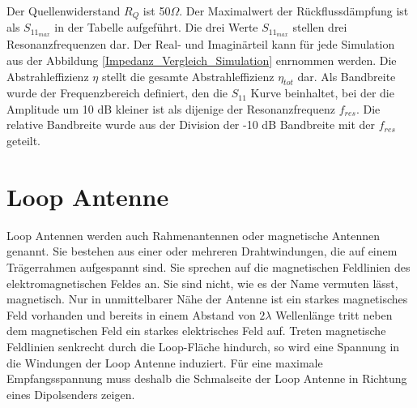
Der Quellenwiderstand $R_Q$ ist 50$\Omega$. Der Maximalwert der Rückflussdämpfung ist als $S_{11_{max}}$ in der Tabelle aufgeführt. Die drei Werte $S_{11_{max}}$ stellen drei Resonanzfrequenzen dar. Der Real- und Imaginärteil kann für jede Simulation aus der Abbildung \ref{Impedanz_Vergleich_Simulation} enrnommen werden. Die Abstrahleffizienz $\eta$ stellt die gesamte Abstrahleffizienz $\eta_{tot}$ dar. Als Bandbreite wurde der Frequenzbereich definiert, den die $S_{11}$ Kurve beinhaltet, bei der die Amplitude um 10 dB kleiner ist als dijenige der Resonanzfrequenz $f_{res}$. Die relative Bandbreite wurde aus der Division der -10 dB Bandbreite mit der $f_{res}$ geteilt.


\newpage
\section{Loop Antenne}
Loop Antennen werden auch Rahmenantennen oder magnetische Antennen genannt. Sie bestehen aus einer oder mehreren Drahtwindungen, die auf einem Trägerrahmen aufgespannt sind. Sie sprechen auf die magnetischen Feldlinien des elektromagnetischen Feldes an. Sie sind nicht, wie es der Name vermuten lässt, magnetisch. Nur in unmittelbarer Nähe der Antenne ist ein starkes magnetisches Feld vorhanden und bereits in einem Abstand von $2\lambda$ Wellenlänge tritt neben dem magnetischen Feld ein starkes elektrisches Feld auf. Treten magnetische Feldlinien senkrecht durch die Loop-Fläche hindurch, so wird eine Spannung in die Windungen der Loop Antenne induziert. Für eine maximale Empfangsspannung muss deshalb die Schmalseite der Loop Antenne in Richtung eines Dipolsenders zeigen.


